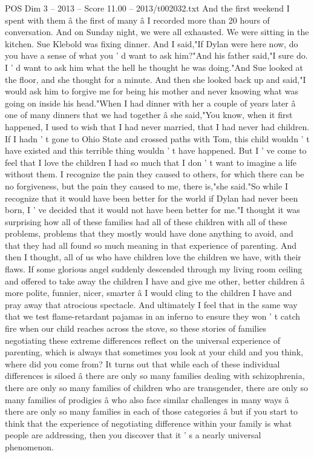 \begin{textsample}{POS Dim 3 – 2013 – Score 11.00 – 2013/t002032.txt}
And the first weekend I spent with them â the first of many â I recorded more than 20 hours of conversation.
And on Sunday night, we were all exhausted.
We were sitting in the kitchen.
Sue Klebold was fixing dinner.
And I said,"If Dylan were here now, do you have a sense of what you ' d want to ask him?"And his father said,"I sure do.
I ' d want to ask him what the hell he thought he was doing."And Sue looked at the floor, and she thought for a minute.
And then she looked back up and said,"I would ask him to forgive me for being his mother and never knowing what was going on inside his head."When I had dinner with her a couple of years later â one of many dinners that we had together â she said,"You know, when it first happened, I used to wish that I had never married, that I had never had children.
If I hadn ' t gone to Ohio State and crossed paths with Tom, this child wouldn ' t have existed and this terrible thing wouldn ' t have happened.
But I ' ve come to feel that I love the children I had so much that I don ' t want to imagine a life without them.
I recognize the pain they caused to others, for which there can be no forgiveness, but the pain they caused to me, there is,"she said."So while I recognize that it would have been better for the world if Dylan had never been born, I ' ve decided that it would not have been better for me."I thought it was surprising how all of these families had all of these children with all of these problems, problems that they mostly would have done anything to avoid, and that they had all found so much meaning in that experience of parenting.
And then I thought, all of us who have children love the children we have, with their flaws.
If some glorious angel suddenly descended through my living room ceiling and offered to take away the children I have and give me other, better children â more polite, funnier, nicer, smarter â I would cling to the children I have and pray away that atrocious spectacle.
And ultimately I feel that in the same way that we test flame-retardant pajamas in an inferno to ensure they won ' t catch fire when our child reaches across the stove, so these stories of families negotiating these extreme differences reflect on the universal experience of parenting, which is always that sometimes you look at your child and you think, where did you come from?
It turns out that while each of these individual differences is siloed â there are only so many families dealing with schizophrenia, there are only so many families of children who are transgender, there are only so many families of prodigies â who also face similar challenges in many ways â there are only so many families in each of those categories â but if you start to think that the experience of negotiating difference within your family is what people are addressing, then you discover that it ' s a nearly universal phenomenon.

\end{textsample}
